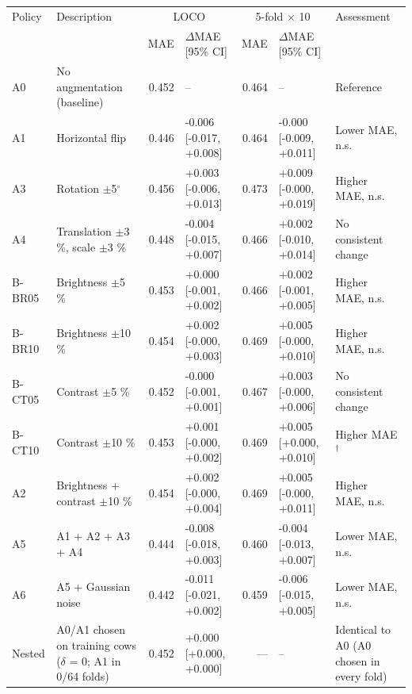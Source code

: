 \begin{tabular}{llrlrll}
\hline
Policy & Description & \multicolumn{2}{c}{LOCO} & \multicolumn{2}{c}{5-fold $\times$ 10} & Assessment \\
 & & MAE & $\Delta$MAE [95\% CI] & MAE & $\Delta$MAE [95\% CI] & \\
\hline
A0 & No augmentation (baseline) & 0.452 & -- & 0.464 & -- & Reference \\
A1 & Horizontal flip & 0.446 & -0.006 [-0.017, +0.008] & 0.464 & -0.000 [-0.009, +0.011] & Lower MAE, n.s. \\
A3 & Rotation $\pm$5$^\circ$ & 0.456 & +0.003 [-0.006, +0.013] & 0.473 & +0.009 [-0.000, +0.019] & Higher MAE, n.s. \\
A4 & Translation $\pm$3 \%, scale $\pm$3 \% & 0.448 & -0.004 [-0.015, +0.007] & 0.466 & +0.002 [-0.010, +0.014] & No consistent change \\
B-BR05 & Brightness $\pm$5 \% & 0.453 & +0.000 [-0.001, +0.002] & 0.466 & +0.002 [-0.001, +0.005] & Higher MAE, n.s. \\
B-BR10 & Brightness $\pm$10 \% & 0.454 & +0.002 [-0.000, +0.003] & 0.469 & +0.005 [-0.000, +0.010] & Higher MAE, n.s. \\
B-CT05 & Contrast $\pm$5 \% & 0.452 & -0.000 [-0.001, +0.001] & 0.467 & +0.003 [-0.000, +0.006] & No consistent change \\
B-CT10 & Contrast $\pm$10 \% & 0.453 & +0.001 [-0.000, +0.002] & 0.469 & +0.005 [+0.000, +0.010] & Higher MAE$^\dagger$ \\
A2 & Brightness + contrast $\pm$10 \% & 0.454 & +0.002 [-0.000, +0.004] & 0.469 & +0.005 [-0.000, +0.011] & Higher MAE, n.s. \\
A5 & A1 + A2 + A3 + A4 & 0.444 & -0.008 [-0.018, +0.003] & 0.460 & -0.004 [-0.013, +0.007] & Lower MAE, n.s. \\
A6 & A5 + Gaussian noise & 0.442 & -0.011 [-0.021, +0.002] & 0.459 & -0.006 [-0.015, +0.005] & Lower MAE, n.s. \\
Nested & A0/A1 chosen on training cows ($\delta$ = 0; A1 in 0/64 folds) & 0.452 & +0.000 [+0.000, +0.000] & — & -- & Identical to A0 (A0 chosen in every fold) \\
\hline
\end{tabular}
